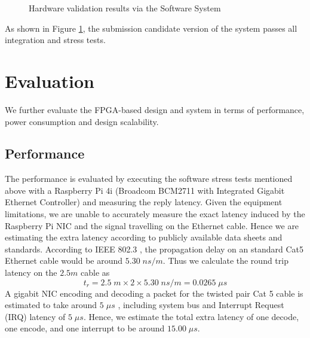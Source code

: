 \documentclass[a4paper]{report}
\begin{document}
\begin{figure}[H]
  \caption{Hardware validation results via the Software System}
  \label{fig:hardware-validation-results}
\end{figure}

As shown in Figure \ref{fig:hardware-validation-results}, the submission candidate version of the system passes all integration and stress tests.

\section{Evaluation}

We further evaluate the FPGA-based design and system in terms of performance, power consumption and design scalability.

\subsection{Performance}

The performance is evaluated by executing the software stress tests mentioned above with a Raspberry Pi 4i (Broadcom BCM2711 with Integrated Gigabit Ethernet Controller) and measuring the reply latency. Given the equipment limitations, we are unable to accurately measure the exact latency induced by the Raspberry Pi NIC and the signal travelling on the Ethernet cable. Hence we are estimating the extra latency according to publicly available data sheets and standards. According to IEEE 802.3 \cite{ieee802.3ethernet-2018}, the propagation delay on an standard Cat5 Ethernet cable would be around $5.30 \; ns/m$. Thus we calculate the round trip latency on the $2.5m$ cable as  
$$
t_r = 2.5\; m \times 2 \times 5.30\; ns /m = 0.0265 \; \mu s
$$ 
A gigabit NIC encoding and decoding a packet for the twisted pair Cat 5 cable is estimated to take around $5 \; \mu s$ \cite{texas-instruments-dp83848x}, including system bus and Interrupt Request (IRQ) latency of $5 \; \mu s$. Hence, we estimate the total extra latency of one decode, one encode, and one interrupt to be around $15.00\; \mu s$.
\end{document}
